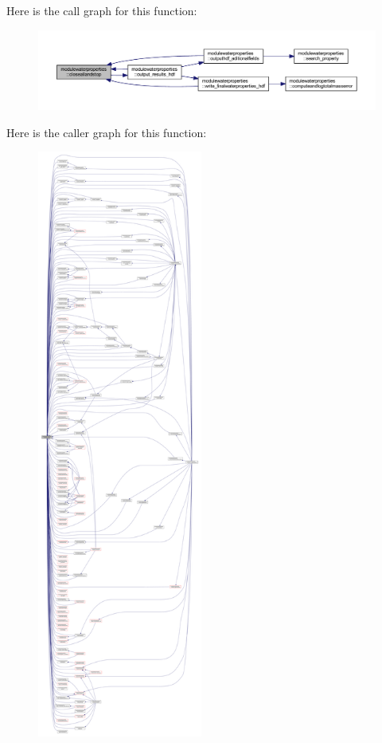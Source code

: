 Here is the call graph for this function\+:\nopagebreak
\begin{figure}[H]
\begin{center}
\leavevmode
\includegraphics[width=350pt]{namespacemodulewaterproperties_a5bb74dfe4637836633ca6817a4a72758_cgraph}
\end{center}
\end{figure}
Here is the caller graph for this function\+:\nopagebreak
\begin{figure}[H]
\begin{center}
\leavevmode
\includegraphics[height=550pt]{namespacemodulewaterproperties_a5bb74dfe4637836633ca6817a4a72758_icgraph}
\end{center}
\end{figure}
\mbox{\label{namespacemodulewaterproperties_aa1d438c16bd8399614f3b5058f6a58e8}} 
